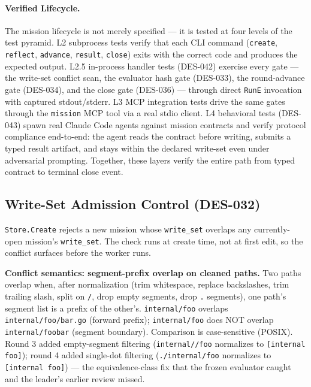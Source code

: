 \documentclass[a4paper,10pt]{article}
\newcommand{\field}[1]{\texttt{#1}}
\newcommand{\cmd}[1]{\texttt{#1}}
\begin{document}
\paragraph{Verified Lifecycle.}
The mission lifecycle is not merely specified --- it is tested at four
levels of the test pyramid.  L2 subprocess tests verify that each CLI
command (\cmd{create}, \cmd{reflect}, \cmd{advance}, \cmd{result},
\cmd{close}) exits with the correct code and produces the expected
output.  L2.5 in-process handler tests (DES-042) exercise every gate
--- the write-set conflict scan, the evaluator hash gate (DES-033),
the round-advance gate (DES-034), and the close gate (DES-036) ---
through direct \texttt{RunE} invocation with captured stdout/stderr.
L3 MCP integration tests drive the same gates through the
\texttt{mission} MCP tool via a real stdio client.  L4 behavioral
tests (DES-043) spawn real Claude Code agents against mission
contracts and verify protocol compliance end-to-end: the agent reads
the contract before writing, submits a typed result artifact, and
stays within the declared write-set even under adversarial prompting.
Together, these layers verify the entire path from typed contract to
terminal close event.

\subsection{Write-Set Admission Control (DES-032)}

\texttt{Store.Create} rejects a new mission whose \field{write\_set}
overlaps any currently-open mission's \field{write\_set}.  The check
runs at create time, not at first edit, so the conflict surfaces
before the worker runs.

\textbf{Conflict semantics: segment-prefix overlap on cleaned paths.}
Two paths overlap when, after normalization (trim whitespace, replace
backslashes, trim trailing slash, split on \texttt{/}, drop empty
segments, drop \texttt{.} segments), one path's segment list is a
prefix of the other's.  \texttt{internal/foo} overlaps
\texttt{internal/foo/bar.go} (forward prefix); \texttt{internal/foo}
does NOT overlap \texttt{internal/foobar} (segment boundary).
Comparison is case-sensitive (POSIX).  Round 3 added empty-segment
filtering (\texttt{internal//foo} normalizes to
\texttt{[internal foo]}); round 4 added single-dot filtering
(\texttt{./internal/foo} normalizes to \texttt{[internal foo]}) ---
the equivalence-class fix that the frozen evaluator caught and the
leader's earlier review missed.
\end{document}
